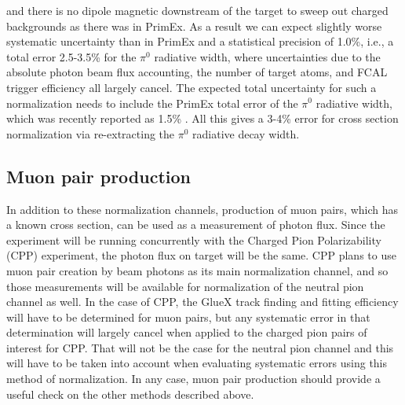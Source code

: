 and there is no dipole magnetic downstream of the target to sweep out
charged backgrounds as there was in PrimEx. As a result we can expect
slightly worse systematic
uncertainty than in PrimEx and a statistical precision of 1.0\%,
i.e., a total error 2.5-3.5\% for the $\pi^0$ radiative width, where uncertainties due to the absolute photon beam flux accounting,
the number of target atoms,
and FCAL trigger efficiency all largely cancel.
The expected total
uncertainty for such a normalization needs to include the PrimEx
total error of the $\pi^0$ radiative width, which was recently
reported as 1.5\% \cite{Larin:2018}.  All this gives a 3-4\%
error for cross section normalization via re-extracting the $\pi^0$
radiative decay width.

\subsection{Muon pair production}
In addition to these normalization channels, production of muon pairs,
which has a known cross section, can be used as a measurement of
photon flux. Since the experiment will be running concurrently with
the Charged Pion Polarizability (CPP) experiment, the photon flux on
target will be the same. CPP plans to use muon pair
creation by beam photons as its main normalization channel, and so
those measurements will be available for normalization of the neutral
pion channel as well. In the case of CPP, the GlueX track finding and
fitting efficiency will have to be determined for muon pairs, but any
systematic error in that determination will largely cancel when
applied to the charged pion pairs of interest for CPP.
That will not be the case for the
neutral pion channel and this will have to be taken into account when
evaluating systematic errors using this method of normalization. In
any case, muon pair production should provide a useful check on the
other methods described above.
